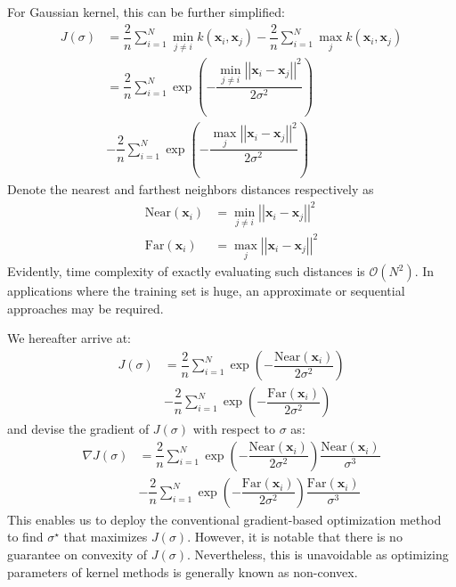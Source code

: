 \documentclass[conference]{IEEEtran}
\begin{document}
For Gaussian kernel, this can be further simplified:
\begin{subequations}
\begin{align}
J (\sigma) &= \dfrac{2}{n} \sum _{i=1}^N \min_{j \ne i}  k \left( \mathbf{x}_i, \mathbf{x}_j\right) - \dfrac{2}{n} \sum _{i=1}^N \max_{j}  k \left( \mathbf{x}_i, \mathbf{x}_j\right) \\
&=\dfrac{2}{n} \sum _{i=1}^N \exp \left( - \dfrac{\min_{j \ne i} \left|\left| \mathbf{x}_i - \mathbf{x}_j \right|\right|^2}{2 \sigma^2}  \right) \nonumber \\
&- \dfrac{2}{n} \sum _{i=1}^N \exp \left( - \dfrac{\max_j \left|\left| \mathbf{x}_i - \mathbf{x}_j \right|\right|^2}{2 \sigma^2}  \right) 
\end{align}
\end{subequations}
Denote the nearest  and farthest neighbors distances respectively as 
\begin{subequations}
\begin{align}
\text{Near} \left( \mathbf{x}_i \right)&=\min_{j \ne i} \left|\left| \mathbf{x}_i - \mathbf{x}_j \right|\right|^2 \label{eq:near_dist} \\
\text{Far} \left( \mathbf{x}_i \right)&=\max_j \left|\left| \mathbf{x}_i - \mathbf{x}_j \right|\right|^2 \label{eq:far_dist}
\end{align}
\end{subequations}
Evidently, time complexity of exactly evaluating such distances is $\mathcal{O}(N^2)$. In applications where the training set is huge, an approximate or sequential approaches may be required.

We hereafter arrive at:
\begin{align}
J (\sigma) &=\dfrac{2}{n} \sum _{i=1}^N \exp \left( - \dfrac{\text{Near} \left( \mathbf{x}_i \right)}{2 \sigma^2} \right) \nonumber \\
& - \dfrac{2}{n} \sum _{i=1}^N \exp \left( - \dfrac{\text{Far} \left( \mathbf{x}_i \right)}{2 \sigma^2}\right) \label{eq:Js}
\end{align}
and devise the gradient of $J (\sigma)$ with respect to $\sigma$ as:
\begin{align}
\nabla J  (\sigma) &= \dfrac{2}{n} \sum _{i=1}^N \exp \left( -\dfrac{\text{Near} \left( \mathbf{x}_i \right)}{2 \sigma^2}\right) \dfrac{\text{Near} \left( \mathbf{x}_i \right)}{\sigma^3} \nonumber \\
& - \dfrac{2}{n} \sum _{i=1}^N \exp \left( -\dfrac{\text{Far} \left( \mathbf{x}_i \right)}{2 \sigma^2}\right) \dfrac{\text{Far} \left( \mathbf{x}_i \right)}{\sigma^3} \label{eq:dJds}
\end{align}
This enables us to deploy the conventional gradient-based optimization method to find $\sigma^\star$ that maximizes $J(\sigma)$. However, it is notable that there is no guarantee on convexity of $J(\sigma)$. Nevertheless, this is unavoidable as optimizing parameters of kernel methods is generally known as non-convex. 
\end{document}
